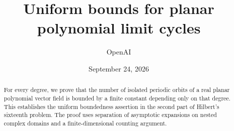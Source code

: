 \documentclass[11pt]{article}
\title{Uniform bounds for planar polynomial limit cycles}
\author{OpenAI}
\date{September 24, 2026}
\begin{document}
\maketitle
\begin{abstract}
For every degree, we prove that the number of isolated periodic orbits of a
real planar polynomial vector field is bounded by a finite constant depending
only on that degree. This establishes the uniform boundedness assertion in
the second part of Hilbert's sixteenth problem. The proof uses separation
of asymptotic expansions on nested complex domains and a finite-dimensional
counting argument.
\end{abstract}
\setcounter{tocdepth}{2}
\tableofcontents













\end{document}
